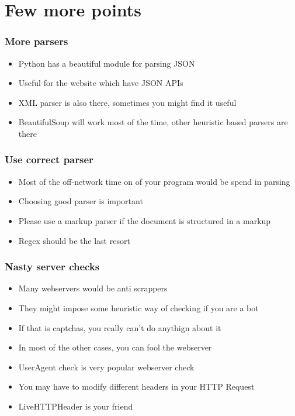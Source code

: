 \documentclass{beamer}
\begin{document}
\section{Few more points}
\label{sec-10}
\begin{frame}
\frametitle{More parsers}
\label{sec-10_1}


\begin{itemize}
\item Python has a beautiful module for parsing JSON
\item Useful for the website which have JSON APIs
\item XML parser is also there, sometimes you might find it useful
\item BeautifulSoup will work most of the time, other heuristic based parsers are there
\end{itemize}
\end{frame}
\begin{frame}
\frametitle{Use correct parser}
\label{sec-10_2}


\begin{itemize}
\item Most of the off-network time on of your program would be spend in parsing
\item Choosing good parser is important
\item Please use a markup parser if the document is structured in a markup
\item Regex should be the last resort
\end{itemize}
\end{frame}
\begin{frame}
\frametitle{Nasty server checks}
\label{sec-10_3}


\begin{itemize}
\item Many webservers would be anti scrappers
\item They might impose some heuristic way of checking if you are a bot
\item If that is captchas, you really can't do anythign about it
\item In most of the other cases, you can fool the webserver
\item UserAgent check is very popular webserver check
\item You may have to modify different headers in your HTTP Request
\item LiveHTTPHeader is your friend
\end{itemize}
\end{frame}
\end{document}

